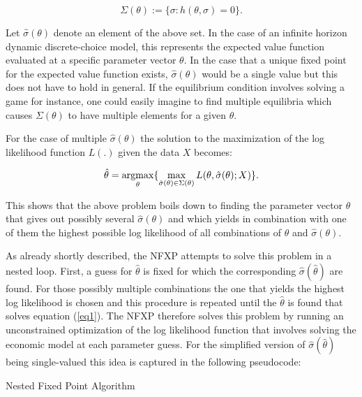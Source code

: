 \begin{equation*}
\Sigma(\theta) := \{\sigma:h(\theta, \sigma)=0\}.
\end{equation*}

Let $\hat{\sigma}(\theta)$ denote an element of the above set. In the case of an infinite horizon dynamic discrete-choice model, this represents the expected value function evaluated at a specific parameter vector $\theta$. In the case that a unique fixed point for the expected value function exists, $\hat{\sigma}(\theta)$ would be a single value but this does not have to hold in general. If the equilibrium condition involves solving a game for instance, one could easily imagine to find multiple equilibria which causes $\Sigma(\theta)$ to have multiple elements for a given $\theta$. 

For the case of multiple $\hat{\sigma}(\theta)$ the solution to the maximization of the log likelihood function $L(.)$ given the data $X$ becomes:

\begin{equation}
\hat\theta = \operatorname*{argmax}_{\theta} \{ \max_{\hat\sigma(\theta)\in\Sigma(\theta)} L(\theta,\hat\sigma(\theta); X)\}. \label{eq1}
\end{equation}

This shows that the above problem boils down to finding the parameter vector $\theta$ that gives out possibly several $\hat{\sigma}(\theta)$ and which yields in combination with one of them the highest possible log likelihood of all combinations of $\theta$ and $\hat{\sigma}(\theta)$.

As already shortly described, the NFXP attempts to solve this problem in a nested loop. First, a guess for $\hat{\theta}$ is fixed for which the corresponding $\hat{\sigma}(\hat\theta)$ are found. For those possibly multiple combinations the one that yields the highest log likelihood is chosen and this procedure is repeated until the $\hat{\theta}$ is found that solves equation (\ref{eq1}). The NFXP therefore solves this problem by running an unconstrained optimization of the log likelihood function that involves solving the economic model at each parameter guess. For the simplified version of $\hat{\sigma}(\hat\theta)$ being single-valued this idea is captured in the following pseudocode:

\vspace{2ex}
\begin{algorithm}[H]
	\SetAlgoLined
	\;
	\caption{Nested Fixed Point Algorithm}
\end{algorithm}
\vspace{2ex}
 
